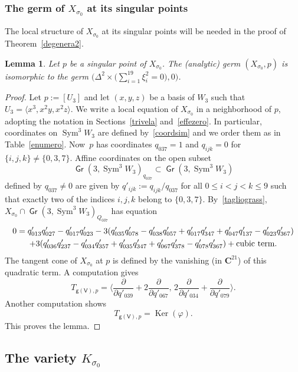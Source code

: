 \documentclass[JEP,XML,SOM,Unicode, NoEqCountersInSection,NoFloatCountersInSection]{cedram}
\newtheorem{lemm}{Lemma}[section]
\theoremstyle{definition}
\renewcommand\C{{\mathbf C}}\let\CC\C
\newcommand\sfg{\mathsf{g}}
\newcommand\sfV{\mathsf{V}}
\newcommand\gv{\sfg(\sfV)}
\DeclareMathOperator{\Gr}{\mathsf{Gr}}
\let\phi\varphi
\let\aff\Delta
\let\la\langle
\let\ra\rangle
\DeclareMathOperator{\Ker}{Ker}
\DeclareMathOperator{\Sym}{Sym}
\begin{document}
\subsubsection{The germ of $X_{\sigma_0}$ at its singular points}

The local structure of $X_{\sigma_0}$ at its singular points will be needed in the proof of Theorem~\ref{degenera2}.

\begin{lemm}\label{normeffe}
Let $p$ be a singular point of $X_{\sigma_0}$. The (analytic) germ $(X_{\sigma_0},p)$ is isomorphic to the germ
$
\bigl(\aff^2\times \bigl(\sum_{i=1}^{19}\xi_i^2=0\bigr),0\bigr)$.
\end{lemm}

\begin{proof}
Let $p:=[U_3]$ and let $(x,y,z)$ be a basis of $W_3$ such that $U_3=\la x^3,x^2y,x^2z\ra$. We write a local equation of $X_{\sigma_0}$ in a neighborhood of
$p$, adopting the notation in Sections~\ref{trivela} and~\ref{effezero}. In particular, coordinates on $\Sym^3 \!W_3$ are defined by~\eqref{coordsim} and we order them as in Table~\ref{enumero}.
Now~$p$ has coordinates $q_{037}=1$ and $q_{ijk}=0$ for $\{i,j,k\}\ne \{0,3,7\}$.
Affine coordinates on the open subset
\[
 \Gr(3,\Sym^3\! W_3)_{q_{037}}\subset \Gr(3,\Sym^3\! W_3)
\]
defined by $q_{037}\ne 0$ are given by $q'_{ijk}:=q_{ijk}/q_{037}$ for all $0\le i<j<k\le 9$ such that exactly two of the indices $i,j,k$ belong to
$\{0,3,7\}$. By~\eqref{tagliograss}, $X_{\sigma_0}\cap \Gr(3,\Sym^3\! W_3)_{Q_{037}}$ has equation\vspace*{-5pt}
\begin{multline*}
0=q'_{013}q'_{027}-q'_{017}q'_{023}-3(q'_{035}q'_{078}-q'_{038}q'_{057}+q'_{017}q'_{347}+q'_{047}q'_{137}-q'_{023}q'_{367})\\
+3(q'_{036}q'_{237}-q'_{034}q'_{357}+q'_{035}q'_{347}
+q'_{067}q'_{378}-q'_{078}q'_{367})+\textnormal{cubic term.}
\end{multline*}
The tangent cone of $X_{\sigma_0}$ at $p$ is defined by the vanishing (in $\C^{21}$) of this quadratic term.
A computation gives
\[
T_{\gv,p}=\Big\la \frac{\partial}{\partial q'_{039}}+2\frac{\partial}{\partial q'_{067}},\, 2\frac{\partial}{\partial q'_{034}}+
\frac{\partial}{\partial q'_{079}}\Bigr\ra.
\]
Another computation shows
\[
T_{\gv,p}=\Ker(\phi).
\]
This proves the lemma.
\end{proof}

\subsection{The variety $K_{\sigma_0}$}\label{se73n}
\end{document}
